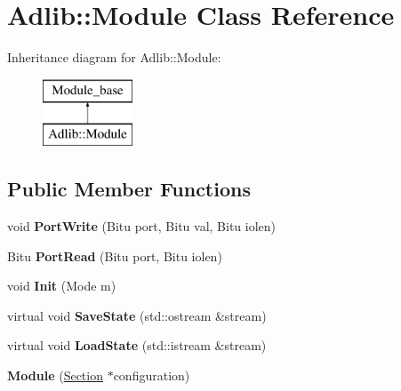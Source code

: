 \hypertarget{classAdlib_1_1Module}{\section{Adlib\-:\-:Module Class Reference}
\label{classAdlib_1_1Module}
}
Inheritance diagram for Adlib\-:\-:Module\-:\begin{figure}[H]
\begin{center}
\leavevmode
\includegraphics[height=2.000000cm]{classAdlib_1_1Module}
\end{center}
\end{figure}
\subsection*{Public Member Functions}
\begin{DoxyCompactItemize}
\item 
\hypertarget{classAdlib_1_1Module_a5c9cf02d284320239eae4e38984b521b}{void {\bfseries Port\-Write} (Bitu port, Bitu val, Bitu iolen)}\label{classAdlib_1_1Module_a5c9cf02d284320239eae4e38984b521b}

\item 
\hypertarget{classAdlib_1_1Module_a31c1330e9e59f170193d8b69e4d6f7a2}{Bitu {\bfseries Port\-Read} (Bitu port, Bitu iolen)}\label{classAdlib_1_1Module_a31c1330e9e59f170193d8b69e4d6f7a2}

\item 
\hypertarget{classAdlib_1_1Module_a525ffe536a1279048d36e154e45f61e8}{void {\bfseries Init} (Mode m)}\label{classAdlib_1_1Module_a525ffe536a1279048d36e154e45f61e8}

\item 
\hypertarget{classAdlib_1_1Module_a692eca3a38c9ced03c0881bb4cc1ef6f}{virtual void {\bfseries Save\-State} (std\-::ostream \&stream)}\label{classAdlib_1_1Module_a692eca3a38c9ced03c0881bb4cc1ef6f}

\item 
\hypertarget{classAdlib_1_1Module_af188cc02f46973d754b7c2fd65ea11a6}{virtual void {\bfseries Load\-State} (std\-::istream \&stream)}\label{classAdlib_1_1Module_af188cc02f46973d754b7c2fd65ea11a6}

\item 
\hypertarget{classAdlib_1_1Module_a85409fe391b5ff9ad9854e244490f01c}{{\bfseries Module} (\hyperlink{classSection}{Section} $\ast$configuration)}\label{classAdlib_1_1Module_a85409fe391b5ff9ad9854e244490f01c}

\end{DoxyCompactItemize}
